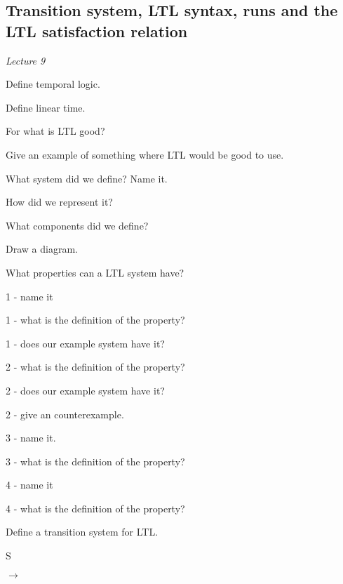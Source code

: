 \documentclass[fleqn]{article}
\begin{document}
\subsection{Transition system, LTL syntax, runs and the LTL satisfaction relation}
\textit{Lecture 9}
\begin{enumerate}
    {\color{red}\item Define temporal logic.}
    {\color{red}\item Define linear time.}
    {\color{red}\item For what is LTL good?}
    {\color{red}\item Give an example of something where LTL would be good to use.}
    {\color{red}\item What system did we define? Name it.}
    \begin{itemize}
        {\color{red}\item How did we represent it? }
        {\color{red}\item What components did we define?}
        {\color{red}\item Draw a diagram.}
    \end{itemize}
    \item What properties can a LTL system have?
    \begin{itemize}
        {\color{red}\item 1 - name it}
        \item 1 - what is the definition of the property?
        \item 1 - does our example system have it? 
        {\color{red}\item 2 - what is the definition of the property?}
        {\color{red}\item 2 - does our example system have it?}
        {\color{red}\item 2 - give an counterexample.}
        {\color{red}\item 3 - name it.}
        {\color{red}\item 3 - what is the definition of the property?}
        {\color{red}\item 4 - name it }
        {\color{red}\item 4 - what is the definition of the property?}
    \end{itemize}
    {\color{red}\item Define a transition system for LTL.}
    \begin{itemize}
        {\color{red}\item S}
        {\color{red}\item $\rightarrow$}

\end{itemize}
\end{enumerate}
\end{document}
